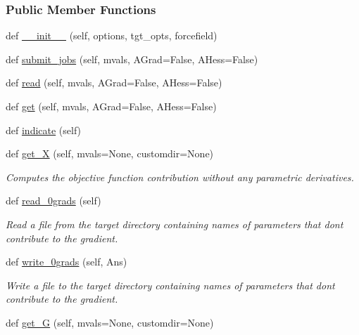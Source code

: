 \subsubsection*{Public Member Functions}
\begin{DoxyCompactItemize}
\item 
def \hyperlink{classsrc_1_1target_1_1RemoteTarget_acc35e5f8e76fa6a54149ff0c930acd6c}{\+\_\+\+\_\+init\+\_\+\+\_\+} (self, options, tgt\+\_\+opts, forcefield)
\item 
def \hyperlink{classsrc_1_1target_1_1RemoteTarget_ac70aab68b1b0782e053d522dc908eb05}{submit\+\_\+jobs} (self, mvals, A\+Grad=False, A\+Hess=False)
\item 
def \hyperlink{classsrc_1_1target_1_1RemoteTarget_a33f52ff218e41fc3c3046af7d8107970}{read} (self, mvals, A\+Grad=False, A\+Hess=False)
\item 
def \hyperlink{classsrc_1_1target_1_1RemoteTarget_ad5a26180c653152b879d4cb82798aa23}{get} (self, mvals, A\+Grad=False, A\+Hess=False)
\item 
def \hyperlink{classsrc_1_1target_1_1RemoteTarget_abe88774b9f4627698672fb68e8caf057}{indicate} (self)
\item 
def \hyperlink{classsrc_1_1target_1_1Target_acd106ed266687c08937944d4c0d17d87}{get\+\_\+X} (self, mvals=None, customdir=None)
\begin{DoxyCompactList}\small\item\em Computes the objective function contribution without any parametric derivatives. \end{DoxyCompactList}\item 
def \hyperlink{classsrc_1_1target_1_1Target_a606efa8b4e93982266468373c809e36a}{read\+\_\+0grads} (self)
\begin{DoxyCompactList}\small\item\em Read a file from the target directory containing names of parameters that don\textquotesingle{}t contribute to the gradient. \end{DoxyCompactList}\item 
def \hyperlink{classsrc_1_1target_1_1Target_af4d54bc36363a73ab3cec203a30d72be}{write\+\_\+0grads} (self, Ans)
\begin{DoxyCompactList}\small\item\em Write a file to the target directory containing names of parameters that don\textquotesingle{}t contribute to the gradient. \end{DoxyCompactList}\item 
def \hyperlink{classsrc_1_1target_1_1Target_abd888e5a08e9858fcf72dbad7133d538}{get\+\_\+G} (self, mvals=None, customdir=None)

\end{DoxyCompactItemize}
